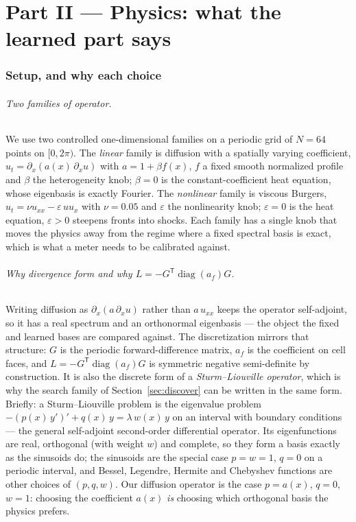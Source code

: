 \documentclass[11pt,a4paper]{article}
\begin{document}
\part*{Part II — Physics: what the learned part says}
\section{Setup, and why each choice}\label{sec:setup}
\paragraph{Two families of operator.} We use two controlled one-dimensional families on a periodic grid of $N=64$ points on $[0,2\pi)$. The \emph{linear} family is diffusion with a spatially varying coefficient, $u_t = \partial_x(a(x)\,\partial_x u)$ with $a = 1 + \beta f(x)$, $f$ a fixed smooth normalized profile and $\beta$ the heterogeneity knob; $\beta=0$ is the constant-coefficient heat equation, whose eigenbasis is exactly Fourier. The \emph{nonlinear} family is viscous Burgers, $u_t = \nu u_{xx} - \varepsilon\,u u_x$ with $\nu = 0.05$ and $\varepsilon$ the nonlinearity knob; $\varepsilon = 0$ is the heat equation, $\varepsilon>0$ steepens fronts into shocks. Each family has a single knob that moves the physics away from the regime where a fixed spectral basis is exact, which is what a meter needs to be calibrated against.

\paragraph{Why divergence form and why $L = -G^{\mathsf T}\operatorname{diag}(a_f)G$.} Writing diffusion as $\partial_x(a\,\partial_x u)$ rather than $a\,u_{xx}$ keeps the operator self-adjoint, so it has a real spectrum and an orthonormal eigenbasis — the object the fixed and learned bases are compared against. The discretization mirrors that structure: $G$ is the periodic forward-difference matrix, $a_f$ is the coefficient on cell faces, and $L = -G^{\mathsf T}\operatorname{diag}(a_f)G$ is symmetric negative semi-definite by construction. It is also the discrete form of a \emph{Sturm–Liouville operator}, which is why the search family of Section~\ref{sec:discover} can be written in the same form. Briefly: a Sturm–Liouville problem is the eigenvalue problem $-(p(x)\,y')' + q(x)\,y = \lambda\, w(x)\, y$ on an interval with boundary conditions — the general self-adjoint second-order differential operator. Its eigenfunctions are real, orthogonal (with weight $w$) and complete, so they form a basis exactly as the sinusoids do; the sinusoids are the special case $p = w = 1$, $q = 0$ on a periodic interval, and Bessel, Legendre, Hermite and Chebyshev functions are other choices of $(p, q, w)$. Our diffusion operator is the case $p = a(x)$, $q = 0$, $w = 1$: choosing the coefficient $a(x)$ \emph{is} choosing which orthogonal basis the physics prefers.
\end{document}
